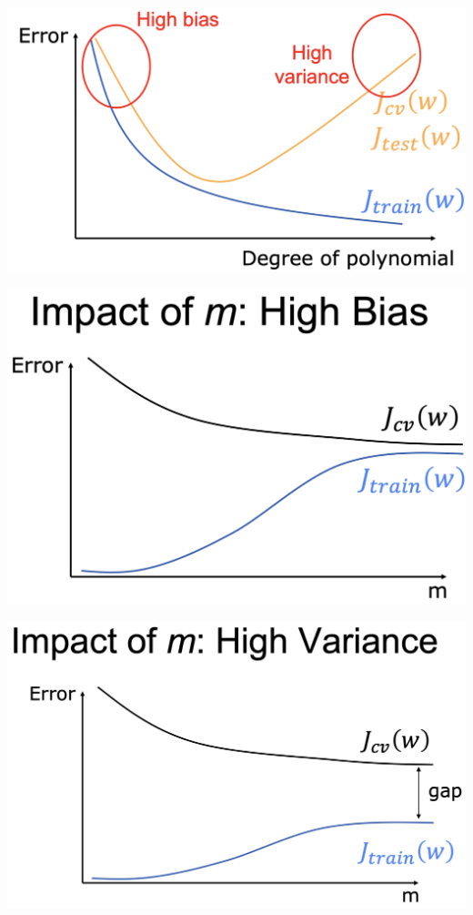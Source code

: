 \documentclass{article}
\begin{document}
\begin{multicols*}{3}
\begin{multicols*}{2}
    \includegraphics[scale=0.1]{bias-and-variance}

    \includegraphics[scale=0.1]{high-bias} 

    \includegraphics[scale=0.09]{high-variance} 


\end{multicols*}
\end{multicols*}
\end{document}
